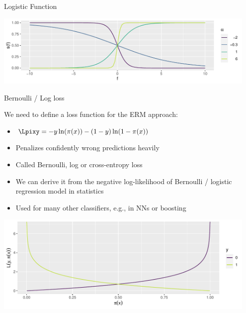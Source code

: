\begin{vbframe}{Logistic Function}
\begin{knitrout}
{\centering \includegraphics[width=0.95\textwidth]{figure/reg_class_log_3} 

}



\end{knitrout}

\end{vbframe}

\begin{vbframe}{Bernoulli / Log loss}

We need to define a loss function for the ERM approach:

\begin{itemize}
  \item $\Lpixy = -y\ln(\pix)-(1-y)\ln(1-\pix)$
  \item Penalizes confidently wrong predictions heavily
  \item Called Bernoulli, log or cross-entropy loss 
  \item We can derive it from the negative log-likelihood of Bernoulli / logistic regression model in statistics
  \item Used for many other classifiers, e.g., in NNs or boosting 
\end{itemize}


\begin{knitrout}\scriptsize
{}\color{fgcolor}

{\centering \includegraphics[width=0.95\textwidth]{figure/reg_class_log_4}  

}



\end{knitrout}

\end{vbframe}

